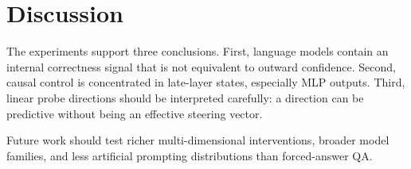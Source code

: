 \section{Discussion}

The experiments support three conclusions. First, language models contain an
internal correctness signal that is not equivalent to outward confidence.
Second, causal control is concentrated in late-layer states, especially MLP
outputs. Third, linear probe directions should be interpreted carefully: a
direction can be predictive without being an effective steering vector.

Future work should test richer multi-dimensional interventions, broader model
families, and less artificial prompting distributions than forced-answer QA.
